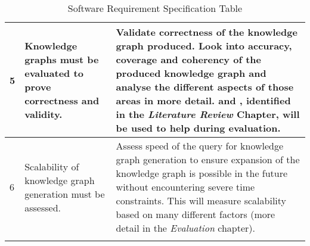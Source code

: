\begin{longtable}{|p{2.25cm}|p{4.5cm}|p{6.5cm}|}
5&
Knowledge graphs must be evaluated to prove correctness and validity. &
Validate correctness of the knowledge graph produced. Look into accuracy, coverage and coherency of the produced knowledge graph and analyse the different aspects of those areas in more detail. \cite{knowledgegraphevaulationbook} and \cite{evaluationpaper}, identified in the \textit{Literature Review} Chapter, will be used to help during evaluation. \\ 
\hline

6&
Scalability of knowledge graph generation must be assessed. &
Assess speed of the query for knowledge graph generation to ensure expansion of the knowledge graph is possible in the future without encountering severe time constraints. This will measure scalability based on many different factors (more detail in the \textit{Evaluation} chapter). 
\\ \hline
\caption{Software Requirement Specification Table}
\end{longtable}

